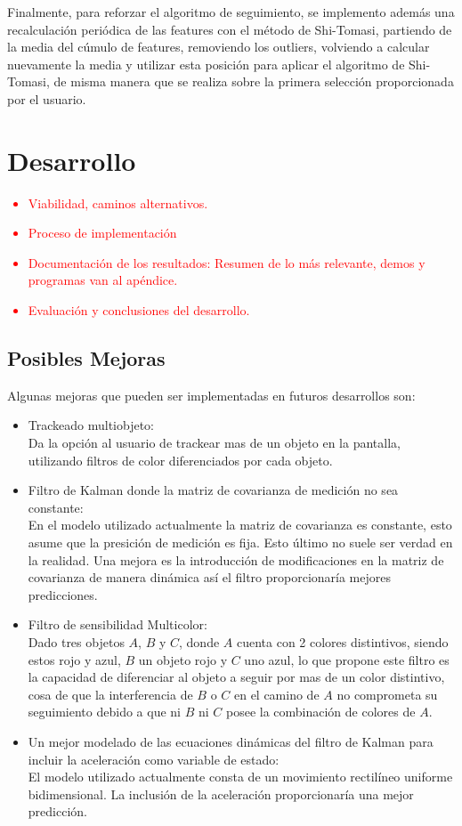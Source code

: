 Finalmente, para reforzar el algoritmo de seguimiento, se implemento además una recalculación periódica de las features con el método de Shi-Tomasi, partiendo de la media del cúmulo de features, removiendo los outliers, volviendo a calcular nuevamente la media y utilizar esta posición para aplicar el algoritmo de Shi-Tomasi, de misma manera que se realiza sobre la primera selección proporcionada por el usuario.

\section{Desarrollo}

\textcolor{red}{
\begin{itemize}
	\item Viabilidad, caminos alternativos.
	\item Proceso de implementación
	\item Documentación de los resultados: Resumen de lo más relevante, demos y programas van al apéndice.
	\item Evaluación y conclusiones del desarrollo.
\end{itemize}
}
\subsection{Posibles Mejoras}
Algunas mejoras que pueden ser implementadas en futuros desarrollos son:
\begin{itemize}
\item Trackeado multiobjeto: \\
Da la opción al usuario de trackear mas de un objeto en la pantalla, utilizando filtros de color diferenciados por cada objeto.
\item Filtro de Kalman donde la matriz de covarianza de medición no sea constante: \\
En el modelo utilizado actualmente la matriz de covarianza es constante, esto asume que la presición de  medición es fija. Esto último no suele ser verdad en la realidad. Una mejora es la introducción de modificaciones en la matriz de covarianza de manera dinámica así el filtro proporcionaría mejores predicciones. 





\item Filtro de sensibilidad Multicolor: \\
Dado tres objetos $A$, $B$ y $C$, donde $A$ cuenta con 2 colores distintivos, siendo estos rojo y azul, $B$ un objeto rojo y $C$ uno azul, lo que propone este filtro es la capacidad de diferenciar al objeto a seguir por mas de un color distintivo, cosa de que la interferencia de $B$ o $C$ en el camino de $A$ no comprometa su seguimiento debido a que ni $B$ ni $C$ posee la combinación de colores de $A$.
\item Un mejor modelado de las ecuaciones dinámicas del filtro de Kalman para incluir la aceleración como variable de estado: \\
El modelo utilizado actualmente consta de un movimiento rectilíneo uniforme bidimensional. La inclusión de la aceleración proporcionaría una mejor predicción.
\end{itemize}




